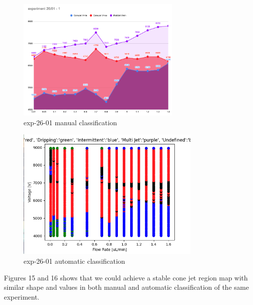     \begin{multicols}{2}


        \begin{figure}[H]
            \center
            \includegraphics[width=8cm]{Figuras/report3/manual-mapping.png}
            \caption{ exp-26-01 manual classification}
        \end{figure}

        \begin{figure}[H]
            \center
            \includegraphics[width=9cm]{Figuras/report3/map-exp-26-01.png}
            \caption{ exp-26-01 automatic classification}
        \end{figure}

    \end{multicols}

    Figures 15 and 16 shows that we could achieve a stable cone jet region map with similar shape and values in both manual and automatic classification of the same experiment.


